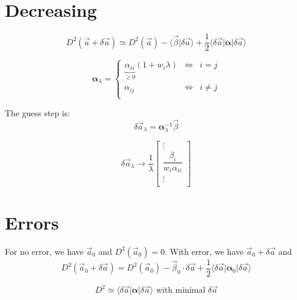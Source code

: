 \documentclass[aps,12pt]{revtex4}
\begin{document}
\section{Decreasing}

\begin{equation}
	 D^2(\vec{a} + \delta \vec{a}) \simeq 
	  D^2(\vec{a}) - \langle \vec{\beta} \vert \delta\vec{a} \rangle 
	  + \dfrac{1}{2} \langle \delta\vec{a} \vert \bm{\alpha}  \vert \delta\vec{a} \rangle 
\end{equation}


\begin{equation}
	\bm{\alpha}_\lambda =
	\left\lbrace
	\begin{array}{ccl}
	\underbrace{\alpha_{ii}}_{\geq0}(1+w_i\lambda) & \iff & i=j\\
	\alpha_{ij} & \iff & i \not= j \\
	\end{array}
	\right.
\end{equation}

The guess step is:
\begin{equation}
	\delta \vec{a}_\lambda = \bm{\alpha}_\lambda^{-1} \vec \beta
\end{equation}

\begin{equation}
	\delta \vec{a}_\lambda \to 
	\dfrac{1}{\lambda}
	\begin{bmatrix}
		\vdots\\
		\dfrac{ \beta_i }{w_i\alpha_{ii}}\\
		\vdots\\
	\end{bmatrix}
\end{equation}

\section{Errors}
For no error, we have $\vec{a}_0$ and $D^2(\vec{a}_0)=0$.
With error, we have $\vec{a}_0+\delta\vec{a}$ and 
\begin{equation}
D^2(\vec{a}_0+\delta\vec{a})=D^2(\vec{a}_0) - \vec{\beta}_0 \cdot \delta\vec{a} + \frac{1}{2} 
\langle \delta \vec{a} \vert \bm{\alpha}_0 \vert \delta \vec{a}\rangle
\end{equation}

\begin{equation}
	D^2 \simeq \langle \delta \vec{a} \vert \bm{\alpha} \vert \delta \vec{a}\rangle \text{ with minimal } \delta \vec{a}
\end{equation}
\end{document}
